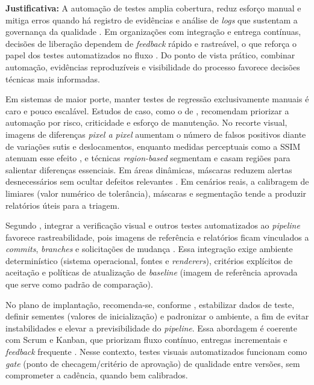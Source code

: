 \documentclass{UNESC}
\begin{document}
\vspace{0.5em}
\noindent
\textbf{Justificativa:} A automação de testes amplia cobertura, reduz esforço manual e mitiga erros quando há registro de evidências e análise de \emph{logs} que sustentam a governança da qualidade \cite{alberto2020,banerjee2013}. Em organizações com integração e entrega contínuas, decisões de liberação dependem de \emph{feedback} rápido e rastreável, o que reforça o papel dos testes automatizados no fluxo \cite{shahin2017}. Do ponto de vista prático, combinar automação, evidências reproduzíveis e visibilidade do processo favorece decisões técnicas mais informadas.

Em sistemas de maior porte, manter testes de regressão exclusivamente manuais é caro e pouco escalável. Estudos de caso, como o de , recomendam priorizar a automação por risco, criticidade e esforço de manutenção. No recorte visual, imagens de diferenças \emph{pixel a pixel} aumentam o número de falsos positivos diante de variações sutis e deslocamentos, enquanto medidas perceptuais como a SSIM atenuam esse efeito \cite{wang2004,ding2022}, e técnicas \emph{region-based} segmentam e casam regiões para salientar diferenças essenciais. Em áreas dinâmicas, máscaras reduzem alertas desnecessários sem ocultar defeitos relevantes \cite{tanno2020}. Em cenários reais, a calibragem de limiares (valor numérico de tolerância), máscaras e segmentação tende a produzir relatórios úteis para a triagem.

Segundo , integrar a verificação visual e outros testes automatizados ao \emph{pipeline} favorece rastreabilidade, pois imagens de referência e relatórios ficam vinculados a \emph{commits}, \emph{branches} e solicitações de mudança \cite{maia2024}. Essa integração exige ambiente determinístico (sistema operacional, fontes e \emph{renderers}), critérios explícitos de aceitação e políticas de atualização de \emph{baseline} (imagem de referência aprovada que serve como padrão de comparação).

No plano de implantação, recomenda-se, conforme , estabilizar dados de teste, definir sementes (valores de inicialização) e padronizar o ambiente, a fim de evitar instabilidades e elevar a previsibilidade do \emph{pipeline}. Essa abordagem é coerente com Scrum e Kanban, que priorizam fluxo contínuo, entregas incrementais e \emph{feedback} frequente \cite{bessa2018}. Nesse contexto, testes visuais automatizados funcionam como \emph{gate} (ponto de checagem/critério de aprovação) de qualidade entre versões, sem comprometer a cadência, quando bem calibrados.
\end{document}
